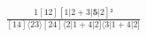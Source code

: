 \documentclass[varwidth, border=5pt]{standalone}
\begin{document}
\begin{my}
$\begin{gathered}
\scriptscriptstyle\frac{1[12][1|2+3|𝟓|2]²}{[14]⟨23⟩[24]⟨2|1+4|2]⟨3|1+4|2]}
\end{gathered}$
\end{my}
\end{document}
